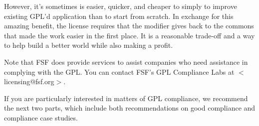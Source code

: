 However, it's sometimes is easier, quicker, and cheaper to simply to
improve existing GPL'd application than to start from scratch.  In
exchange for this amazing benefit, the license requires that the modifier gives
back to the commons that made the work easier in the first place. It is a
reasonable trade-off and a way to help build a better world while also
making a profit.

Note that FSF does provide services to assist companies who need
assistance in complying with the GPL. You can contact FSF's GPL
Compliance Labs at $<$licensing@fsf.org$>$.


If you are particularly interested in matters of GPL compliance, we
recommend the next two parts, which include both recommendations on good
compliance and compliance case studies.



